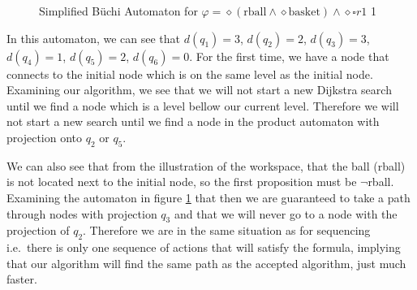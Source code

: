 \begin{figure}
\centering
{}
\caption{Simplified B\"uchi Automaton for $\varphi = \diamond (\text{rball} \wedge \diamond \text{basket}) \wedge \diamond \square r1$ 1}
\label{fig:ex1SimplifiedBuchi}
\end{figure} 

In this automaton, we can see that $d(q_1)=3$, $d(q_2)=2$, $d(q_3)=3$, $d(q_4)=1$, $d(q_5)=2$, $d(q_6)=0$. For the first time, we have a node that connects to the initial node which is on the same level as the initial node. Examining our algorithm, we see that we will not start a new Dijkstra search until we find a node which is a level bellow our current level. Therefore we will not start a new search until we find a node in the product automaton with projection onto $q_2$ or $q_5$.

We can also see that from the illustration of the workspace, that the ball (rball) is not located next to the initial node, so the first proposition must be $\neg$rball. Examining the automaton in figure \ref{fig:ex1SimplifiedBuchi} that then we are guaranteed to take a path through nodes with projection $q_3$ and that we will never go to a node with the projection of $q_2$. Therefore we are in the same situation as for sequencing i.e.\ there is only one sequence of actions that will satisfy the formula, implying that our algorithm will find the same path as the accepted algorithm, just much faster. 

